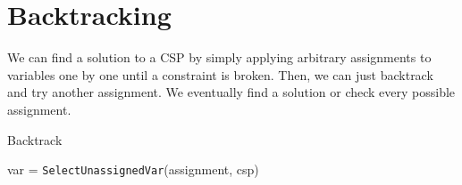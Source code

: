 \section{Backtracking}
We can find a solution to a CSP by simply applying arbitrary assignments to variables one by one until a constraint is broken. Then, we can just backtrack and try another assignment. We eventually find a solution or check every possible assignment.

\begin{algorithm}[H]
	\DontPrintSemicolon
	\caption{Backtrack}
	var = \texttt{SelectUnassignedVar}(assignment, csp) \\
\end{algorithm}
